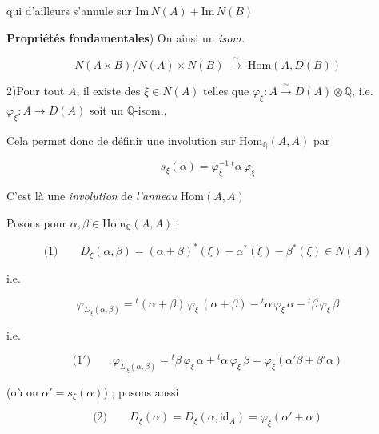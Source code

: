 \documentclass[11pt,a4paper]{article}
\begin{document}

qui d'ailleurs s'annule sur $\mathrm{Im}\,N(A) + \mathrm{Im}\,N(B)$

\textbf{Propriétés fondamentales}) On  ainsi un
\emph{isom.}

\[
  N(A\times B) \big/ N(A)\times N(B) \;\xrightarrow{\ \sim\ }\;
  \mathrm{Hom}(A, D(B))
\]



2)\quad Pour tout $A$, il existe des $\xi \in N(A)$ telles que
$\varphi_{\xi} : A \xrightarrow{\ \sim\ } D(A) \otimes \mathbb{Q}$,
\struck{\ill{}} i.e. $\varphi_{\xi} : A \longrightarrow D(A)$ soit un
$\mathbb{Q}$-isom.,


Cela permet donc de définir une involution sur
$\mathrm{Hom}_{\mathbb{Q}}(A,A)$ par

\[
  s_{\xi}(\alpha) = \varphi_{\xi}^{-1}\,{}^{t}\alpha\,\varphi_{\xi}
\]

C'est là une \emph{involution} \struck{\ill{}} de \emph{l'anneau}
$\mathrm{Hom}(A,A)$

Posons pour $\alpha, \beta \in \mathrm{Hom}_{\mathbb{Q}}(A,A)$ :

\[
  \text{(1)}\qquad D_{\xi}(\alpha,\beta) = (\alpha+\beta)^{*}(\xi) -
  \alpha^{*}(\xi) - \beta^{*}(\xi) \in N(A)
\]

i.e.

\[
  \varphi_{D_{\xi}(\alpha,\beta)} = {}^{t}(\alpha+\beta)\,\varphi_{\xi}\,
  (\alpha+\beta) - {}^{t}\alpha\,\varphi_{\xi}\,\alpha -
  {}^{t}\beta\,\varphi_{\xi}\,\beta
\]

i.e.

\[
  \text{(1$'$)}\qquad \varphi_{D_{\xi}(\alpha,\beta)} =
  {}^{t}\beta\,\varphi_{\xi}\,\alpha + {}^{t}\alpha\,\varphi_{\xi}\,\beta
  = \varphi_{\xi}(\alpha'\beta + \beta'\alpha)
\]


(où on  $\alpha' = s_{\xi}(\alpha)$) ; \ill{} posons aussi

\[
  \text{(2)}\qquad D_{\xi}(\alpha) = D_{\xi}(\alpha, \mathrm{id}_{A}) =
  \varphi_{\xi}(\alpha' + \alpha)
\]
\end{document}

